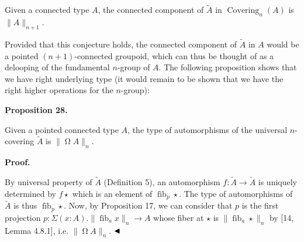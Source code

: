  
Given a connected type $A$, the connected component of $\tilde{A}$ in $\operatorname{Covering}_{n}(A)$ is $\|A\|_{n+1}$.\par
 
 
 
 
Provided that this conjecture holds, the connected component of $\tilde{A}$ in $A$ would be a pointed $(n{+}1)$-connected groupoid, which can thus be thought of as a delooping of the fundamental $n$-group of $A$. The following proposition shows that we have right underlying type (it would remain to be shown that we have the right higher operations for the $n$-group):\par
 
 
 
\par\medskip\noindent\textbf{Proposition 28.}\par
 
 
Given a pointed connected type $A$, the type of automorphisms of the universal $n$-covering $\tilde{A}$ is $\|\operatorname{\Omega}A\|_{n}$.\par
 
 
 
 
 
\par\medskip\noindent\textbf{Proof.}\par
 
 
By universal property of $\tilde{A}$ (Definition 5), an automorphism $f:\tilde{A}\to\tilde{A}$ is uniquely determined by $f\star$ which is an element of $\operatorname{fib}_{p}\star$. The type of automorphisms of $\tilde{A}$ is thus $\operatorname{fib}_{p}\star$. Now, by Proposition 17, we can consider that $p$ is the first projection $p:\Sigma(x:A).\|\operatorname{fib}_{a}x\|_{n}\to A$ whose fiber at $\star$ is $\|\operatorname{fib}_{a}\star\|_{n}$ by [14, Lemma 4.8.1], i.e. $\|\operatorname{\Omega}A\|_{n}$. $\hfill\blacktriangleleft$\par
 
